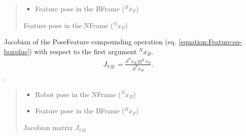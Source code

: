 \documentclass[letterpaper,10pt,english]{sphinxmanual}
\begin{document}
\begin{fulllineitems}
\begin{fulllineitems}
\begin{quote}
\begin{description}
\begin{itemize}
\item {} 
\sphinxAtStartPar
{} \textendash{} Feature pose in the B\sphinxhyphen{}Frame (\(^Bx_F\))

\end{itemize}

\sphinxAtStartPar
Feature pose in the N\sphinxhyphen{}Frame (\(^Nx_F\))

\end{description}\end{quote}

\end{fulllineitems}


\begin{fulllineitems}
\label{\detokenize{Feature:Feature.Feature.J_1boxplus}}
\pysigstartsignatures
{}
\pysigstopsignatures
\sphinxAtStartPar
Jacobian of the Pose\sphinxhyphen{}Feature compounding operation (eq. \eqref{equation:Feature:eq-boxplus}) with respect to the first argument \(^Nx_B\).
\begin{equation}\label{equation:Feature:eq-boxplus}
\begin{split}J_{1\boxplus}=\frac{\partial ^Nx_B \boxplus ^Bx_F}{\partial ^Nx_B}.\end{split}
\end{equation}
\sphinxAtStartPar
{}.
\begin{quote}\begin{description}
\begin{itemize}
\item {} 
\sphinxAtStartPar
{} \textendash{} Robot pose in the N\sphinxhyphen{}Frame (\(^Nx_B\))

\item {} 
\sphinxAtStartPar
{} \textendash{} Feature pose in the B\sphinxhyphen{}Frame (\(^Bx_F\))

\end{itemize}

\sphinxAtStartPar
Jacobian matrix \(J_{1\boxplus}\)

\end{description}\end{quote}


\end{fulllineitems}
\end{fulllineitems}
\end{document}
